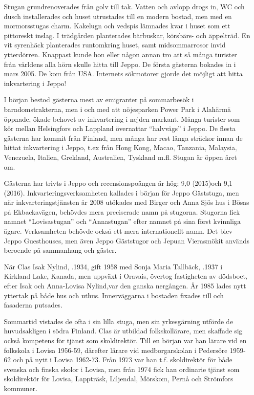 
Stugan grundrenoverades från golv till tak. Vatten och avlopp drogs in, WC och dusch installerades och huset utrustades till en modern bostad, men med en mormorsstugas charm. Kakelugn och vedspis lämnades kvar i huset som ett pittoreskt inslag. I trädgården planterades bärbuskar, körsbärs- och äppelträd. En vit syrenhäck planterades runtomkring huset, samt midsommarrosor invid ytterdörren. Knappast kunde hon eller någon annan tro att så många turister från världens alla hörn skulle hitta till Jeppo. De första gästerna bokades in i mars 2005. De kom från USA. Internets sökmotorer gjorde det möjligt att hitta inkvartering i Jeppo!

I början bestod gästerna mest av emigranter på sommarbesök i barndomstrakterna, men i och med att nöjesparken Power Park i Alahärmä öppnade, ökade behovet av inkvartering i nejden markant. Många turister som kör mellan Helsingfors och Lappland övernattar ``halvvägs'' i Jeppo. De flesta gästerna har kommit från Finland, men många har rest långa sträckor innan de hittat inkvartering i Jeppo, t.ex från Hong Kong, Macao, Tanzania, Malaysia, Venezuela, Italien, Grekland, Australien, Tyskland m.fl. Stugan är öppen året om.

Gästerna har trivts i Jeppo och recensionspoängen är hög; 9,0 (2015)och 9,1 (2016). Inkvarteringsverksamheten kallades i början för Jeppo Gäststuga, men när inkvarteringstjänsten år 2008 utökades med Birger och Anna Sjös hus i Bösas på Ekbackavägen, behövdes mera preciserade namn på stugorna. Stugorna fick namnet ``Lovisastugan'' och ``Annastugan'' efter namnet på sina först kvinnliga ägare. Verksamheten behövde också ett mera internationellt namn. Det blev Jeppo Guesthouses, men även Jeppo Gäststugor och Jepuan Vierasmökit används beroende på sammanhang och gäster.


När Clas Isak Nylind, .1934, gift 1958 med Sonja Maria Tallbäck, .1937 i Kirkland Lake, Kanada, men uppväxt i Oravais, övertog fastigheten av dödsboet, efter Isak och Anna-Lovisa Nylind,var den ganska nergången. År 1985 lades nytt yttertak på både hus och uthus. Innerväggarna i bostaden fixades till och fasaderna putsades.

Sommartid vistades de ofta i sin lilla stuga, men sin yrkesgärning utförde de huvudsakligen i södra Finland. Clas är utbildad folkskollärare, men skaffade sig också kompetens för tjänst som skoldirektör. Till en början var han lärare vid en folkskola i Lovisa 1956-59, därefter lärare vid medborgarskolan i Pedersöre 1959-62 och på nytt i Lovisa 1962-73. Från 1973 var han t.f. skoldirektör för både svenska och finska skolor i Lovisa, men från 1974 fick han ordinarie tjänst som skoldirektör för Lovisa, Lappträsk, Liljendal, Mörskom, Pernå och Strömfors kommuner.

